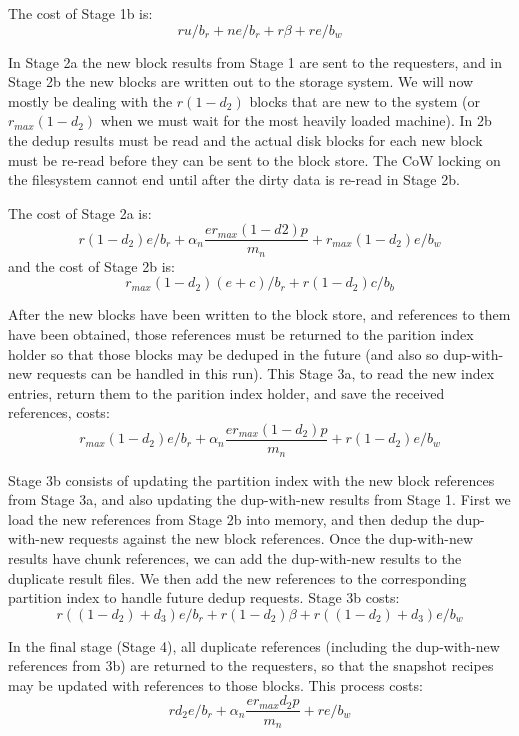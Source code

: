 The cost of Stage 1b is:
\[
    r u / b_r + n e / b_r + r \beta + r e / b_w
\]

In Stage 2a the new block results from Stage 1 are sent to the requesters, and
in Stage 2b the new blocks are written out to the storage system. We will now
mostly be dealing with the $r(1-d_2)$ blocks that are new to the system (or
$r_{max}(1-d_2)$ when we must wait for the most heavily loaded machine). In 2b
the dedup results must be read and the actual disk blocks for each new block
must be re-read before they can be sent to the block store. The CoW locking on
the filesystem cannot end until after the dirty data is re-read in Stage 2b.

The cost of Stage 2a is:
\[
    r(1-d_2)e / b_r + \alpha_n\frac{e r_{max}(1-d2) p}{m_n} + r_{max}(1-d_2)e / b_w
\]
and the cost of Stage 2b is:
\[
    r_{max}(1-d_2)(e+c) / b_r + r(1-d_2)c / b_b
\]

After the new blocks have been written to the block store, and references to
them have been obtained, those references must be returned to the parition
index holder so that those blocks may be deduped in the future (and also so
dup-with-new requests can be handled in this run). This Stage 3a, to read the
new index entries, return them to the parition index holder, and save the
received references, costs:
\[
    r_{max} (1-d_2)e / b_r + \alpha_n\frac{e r_{max}(1-d_2) p}{m_n} + r(1-d_2)e / b_w
\]

Stage 3b consists of updating the partition index with the new block references
from Stage 3a, and also updating the dup-with-new results from Stage 1. First
we load the new references from Stage 2b into memory, and then dedup the
dup-with-new requests against the new block references. Once the dup-with-new
results have chunk references, we can add the dup-with-new results to the
duplicate result files. We then add the new references to the corresponding
partition index to handle future dedup requests. Stage 3b costs:
\[
    r ((1-d_2) + d_3)e/b_r + r (1-d_2)\beta + r((1-d_2) + d_3)e / b_w
\]

In the final stage (Stage 4), all duplicate references (including the
dup-with-new references from 3b) are returned to the requesters, so that the
snapshot recipes may be updated with references to those blocks. This process
costs:
\[
    r d_2 e / b_r + \alpha_n\frac{e r_{max} d_2 p}{m_n} + r e / b_w
\]


